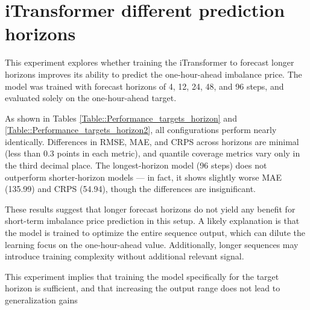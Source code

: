 \documentclass[class=scrbook, crop=false]{standalone}
\begin{document}


\section{iTransformer different prediction horizons}
This experiment explores whether training the iTransformer to forecast longer horizons improves its ability to predict the one-hour-ahead imbalance price. The model was trained with forecast horizons of 4, 12, 24, 48, and 96 steps, and evaluated solely on the one-hour-ahead target.

As shown in Tables \ref{Table::Performance_targets_horizon} and \ref{Table::Performance_targets_horizon2}, all configurations perform nearly identically. Differences in RMSE, MAE, and CRPS across horizons are minimal (less than 0.3 points in each metric), and quantile coverage metrics vary only in the third decimal place. The longest-horizon model (96 steps) does not outperform shorter-horizon models — in fact, it shows slightly worse MAE (135.99) and CRPS (54.94), though the differences are insignificant.

These results suggest that longer forecast horizons do not yield any benefit for short-term imbalance price prediction in this setup. A likely explanation is that the model is trained to optimize the entire sequence output, which can dilute the learning focus on the one-hour-ahead value. Additionally, longer sequences may introduce training complexity without additional relevant signal.

This experiment implies that training the model specifically for the target horizon is sufficient, and that increasing the output range does not lead to generalization gains
\end{document}
